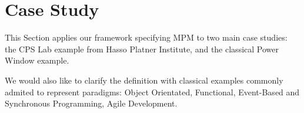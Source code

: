 \section{Case Study}

This Section applies our framework specifying MPM to two main case studies: the CPS Lab example from Hasso Platner Institute, and the classical Power Window example. 

We would also like to clarify the definition with classical examples commonly admited to represent paradigms: Object Orientated, Functional, Event-Based and Synchronous Programming, Agile Development.

